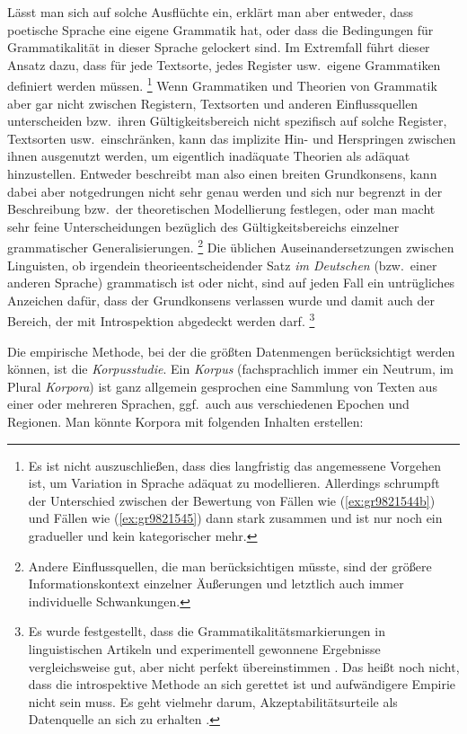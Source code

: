 Lässt man sich auf solche Ausflüchte ein, erklärt man aber entweder, dass poetische Sprache eine eigene Grammatik hat, oder dass die Bedingungen für Grammatikalität in dieser Sprache gelockert sind.
Im Extremfall führt dieser Ansatz dazu, dass für jede Textsorte, jedes Register usw.\ eigene Grammatiken definiert werden müssen.%
\footnote{Es ist nicht auszuschließen, dass dies langfristig das angemessene Vorgehen ist, um Variation in Sprache adäquat zu modellieren.
Allerdings schrumpft der Unterschied zwischen der Bewertung von Fällen wie (\ref{ex:gr9821544b}) und Fällen wie (\ref{ex:gr9821545}) dann stark zusammen und ist nur noch ein gradueller und kein kategorischer mehr.}
Wenn Grammatiken und Theorien von Grammatik aber gar nicht zwischen Registern, Textsorten und anderen Einflussquellen unterscheiden bzw.\ ihren Gültigkeitsbereich nicht spezifisch auf solche Register, Textsorten usw.\ einschränken, kann das implizite Hin- und Herspringen zwischen ihnen ausgenutzt werden, um eigentlich inadäquate Theorien als adäquat hinzustellen.
Entweder beschreibt man also einen breiten Grundkonsens, kann dabei aber notgedrungen nicht sehr genau werden und sich nur begrenzt in der Beschreibung bzw.\ der theoretischen Modellierung festlegen, oder man macht sehr feine Unterscheidungen bezüglich des Gültigkeitsbereichs einzelner grammatischer Generalisierungen.%
\footnote{Andere Einflussquellen, die man berücksichtigen müsste, sind der größere Informationskontext einzelner Äußerungen und letztlich auch immer individuelle Schwankungen.}
Die üblichen Auseinandersetzungen zwischen Linguisten, ob irgendein theorieentscheidender Satz \textit{im Deutschen} (bzw.\ einer anderen Sprache) grammatisch ist oder nicht, sind auf jeden Fall ein untrügliches Anzeichen dafür, dass der Grundkonsens verlassen wurde und damit auch der Bereich, der mit Introspektion abgedeckt werden darf.%
\footnote{Es wurde festgestellt, dass die Grammatikalitätsmarkierungen in linguistischen Artikeln und experimentell gewonnene Ergebnisse vergleichsweise gut, aber nicht perfekt übereinstimmen \citep{SprouseEa2013}.
	Das heißt noch nicht, dass die introspektive Methode an sich gerettet ist und aufwändigere Empirie nicht sein muss.
	Es geht vielmehr darum, Akzeptabilitätsurteile als Datenquelle an sich zu erhalten \citep{SchuetzeSprouse2014}.}

Die empirische Methode, bei der die größten Datenmengen berücksichtigt werden können, ist die \textit{Korpusstudie}.
Ein \textit{Korpus} (fachsprachlich immer ein Neutrum, im Plural \textit{Korpora}) ist ganz allgemein gesprochen eine Sammlung von Texten aus einer oder mehreren Sprachen, ggf.\ auch aus verschiedenen Epochen und Regionen.
Man könnte \zB Korpora mit folgenden Inhalten erstellen:

